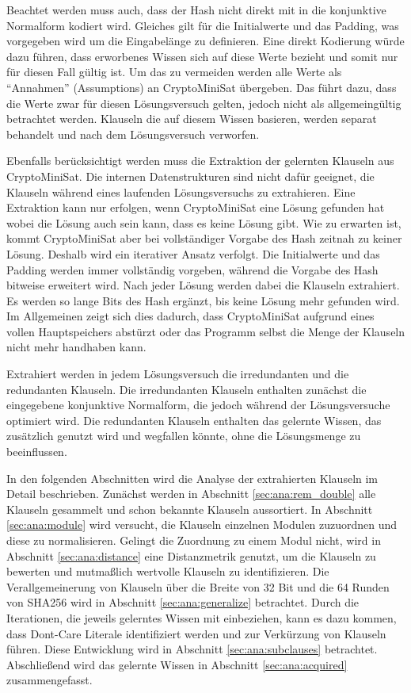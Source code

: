 Beachtet werden muss auch, dass der Hash nicht direkt mit in die konjunktive Normalform kodiert wird. Gleiches gilt für die Initialwerte
und das Padding, was vorgegeben wird um die Eingabelänge zu definieren. Eine direkt Kodierung würde dazu führen, dass erworbenes Wissen
sich auf diese Werte bezieht und somit nur für diesen Fall gültig ist. Um das zu vermeiden werden alle Werte als "`Annahmen"' (Assumptions)
an CryptoMiniSat übergeben. Das führt dazu, dass die Werte zwar für diesen Lösungsversuch gelten, jedoch nicht als allgemeingültig betrachtet
werden. Klauseln die auf diesem Wissen basieren, werden separat behandelt und nach dem Lösungsversuch verworfen.

Ebenfalls berücksichtigt werden muss die Extraktion der gelernten Klauseln aus CryptoMiniSat. Die internen Datenstrukturen sind nicht dafür
geeignet, die Klauseln während eines laufenden Lösungsversuchs zu extrahieren. Eine Extraktion kann nur erfolgen, wenn CryptoMiniSat eine
Lösung gefunden hat wobei die Lösung auch sein kann, dass es keine Lösung gibt. Wie zu erwarten ist, kommt CryptoMiniSat aber bei vollständiger
Vorgabe des Hash zeitnah zu keiner Lösung. Deshalb wird ein iterativer Ansatz verfolgt. Die Initialwerte und das Padding werden immer vollständig vorgeben,
während die Vorgabe des Hash bitweise erweitert wird. Nach jeder Lösung werden dabei die Klauseln extrahiert. Es werden so lange Bits des Hash
ergänzt, bis keine Lösung mehr gefunden wird. Im Allgemeinen zeigt sich dies dadurch, dass CryptoMiniSat aufgrund eines vollen Hauptspeichers
abstürzt oder das Programm selbst die Menge der Klauseln nicht mehr handhaben kann.

Extrahiert werden in jedem Lösungsversuch die irredundanten und die redundanten Klauseln. Die irredundanten Klauseln enthalten zunächst die
eingegebene konjunktive Normalform, die jedoch während der Lösungsversuche optimiert wird. Die redundanten Klauseln enthalten das gelernte
Wissen, das zusätzlich genutzt wird und wegfallen könnte, ohne die Lösungsmenge zu beeinflussen.

In den folgenden Abschnitten wird die Analyse der extrahierten Klauseln im Detail beschrieben. Zunächst werden in Abschnitt \ref{sec:ana:rem_double}
alle Klauseln gesammelt und schon bekannte Klauseln aussortiert. In Abschnitt \ref{sec:ana:module} wird versucht, die Klauseln einzelnen Modulen
zuzuordnen und diese zu normalisieren. Gelingt die Zuordnung zu einem Modul nicht, wird in Abschnitt \ref{sec:ana:distance} eine Distanzmetrik
genutzt, um die Klauseln zu bewerten und mutmaßlich wertvolle Klauseln zu identifizieren. Die Verallgemeinerung von Klauseln über die Breite von
32 Bit und die 64 Runden von SHA256 wird in Abschnitt \ref{sec:ana:generalize} betrachtet. Durch die Iterationen, die jeweils gelerntes Wissen mit
einbeziehen, kann es dazu kommen, dass Dont-Care Literale identifiziert werden und zur Verkürzung von Klauseln führen. Diese Entwicklung wird in
Abschnitt \ref{sec:ana:subclauses} betrachtet. Abschließend wird das gelernte Wissen in Abschnitt \ref{sec:ana:acquired} zusammengefasst.






